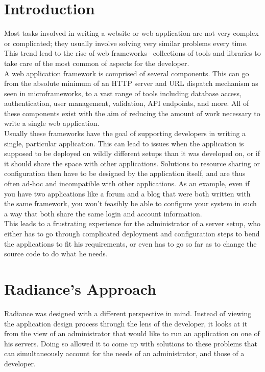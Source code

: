 \documentclass{sig-alternate}
\begin{document}
\printccsdesc

\newpage

\section{Introduction}
Most tasks involved in writing a website or web application are not very complex or complicated; they usually involve solving very similar problems every time. This trend lead to the rise of web frameworks-- collections of tools and libraries to take care of the most common of aspects for the developer. \\

A web application framework is comprised of several components. This can go from the absolute minimum of an HTTP server and URL dispatch mechanism as seen in microframeworks\cite{microframeworks}, to a vast range of tools including database access, authentication, user management, validation, API endpoints, and more. All of these components exist with the aim of reducing the amount of work necessary to write a single web application. \\

Usually these frameworks have the goal of supporting developers in writing a single, particular application. This can lead to issues when the application is supposed to be deployed on wildly different setups than it was developed on, or if it should share the space with other applications. Solutions to resource sharing or configuration then have to be designed by the application itself, and are thus often ad-hoc and incompatible with other applications. As an example, even if you have two applications like a forum and a blog that were both written with the same framework, you won't feasibly be able to configure your system in such a way that both share the same login and account information. \\

This leads to a frustrating experience for the administrator of a server setup, who either has to go through complicated deployment and configuration steps to bend the applications to fit his requirements, or even has to go so far as to change the source code to do what he needs.

\section{Radiance's Approach}
Radiance was designed with a different perspective in mind. Instead of viewing the application design process through the lens of the developer, it looks at it from the view of an administrator that would like to run an application on one of his servers. Doing so allowed it to come up with solutions to these problems that can simultaneously account for the needs of an administrator, and those of a developer. \\
\end{document}

